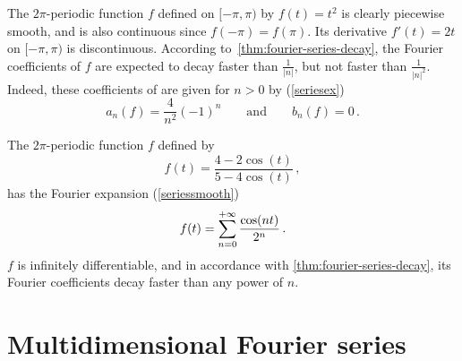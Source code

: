 \begin{example}
  The $2\pi$-periodic function $f$ defined on $[-\pi,\pi)$ by $f(t)=t^2$ is clearly
  piecewise smooth, and is also continuous since $f(-\pi)=f(\pi)$. Its derivative
  $f'(t)=2t$ on $[-\pi,\pi)$ is discontinuous. According
  to~\cref{thm:fourier-series-decay}, the Fourier coefficients of $f$ are expected to
  decay faster than $\frac{1}{|n|}$, but not faster than $\frac{1}{|n|^2 }$. Indeed, these
  coefficients of are given for $n>0$ by (\cf\cref{seriesex})
  \begin{equation}
    a_n(f)=\frac{4}{n^2}(-1)^n\qquad\text{and}\qquad b_n(f)=0\,.
  \end{equation}
\end{example}
\begin{example}
  The $2\pi$-periodic function $f$ defined by
  \begin{equation}
    f(t)=\frac{4-2\cos(t)}{5-4\cos(t)}\,,
  \end{equation}
  has the Fourier expansion (\cf\cref{seriessmooth})
  \begin{equation}
    f(t)=\sum_{n=0}^{+\infty}\frac{\cos(nt)}{2^n}\,.
  \end{equation}
  $f$ is infinitely differentiable, and in accordance with
  \cref{thm:fourier-series-decay}, its Fourier coefficients decay faster than any power of
  $n$.
\end{example}
\section{Multidimensional Fourier series}